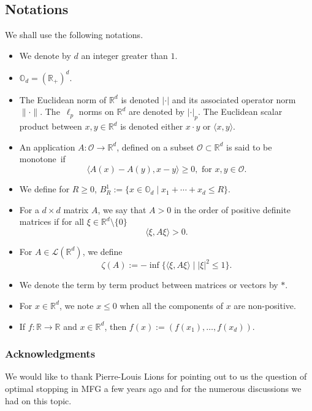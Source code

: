 \documentclass[10pt]{amsart}
\let\mathcal\mathscr
\let\sep\mid
\theoremstyle{definition}
\begin{document}
\subsection*{Notations}
We shall use the following notations.
\begin{itemize}
\item We denote by $d$ an integer greater than $1$.
\item $\mathbb{O}_d = (\mathbb{R}_+)^d$.
\item The Euclidean norm of $\mathbb{R}^d$ is denoted $|{\cdot}|$ and its associated operator norm $\|{\cdot}\|$. The~$\ell_p$ norms on $\mathbb{R}^d$ are denoted by $|{\cdot}|_p$. The Euclidean scalar product between \hbox{$x,y \in \mathbb{R}^d$} is denoted either $x \cdot y$ or $\langle x, y \rangle$.
\item An application $A: \mathcal{O} \to \mathbb{R}^d$, defined on a subset $\mathcal{O} \subset \mathbb{R}^d$ is said to be monotone~if
\begin{equation*}
\langle A(x)- A(y) , x-y \rangle \geq 0, \text{ for } x,y \in \mathcal{O}.
\end{equation*}
\item We define for $R\geq 0$, $B^1_R:= \{ x \in \mathbb{O}_d\sep x_1+\cdots+x_d \leq R\}$.
\item For a $d\times d$ matrix $A$, we say that $A > 0$ in the order of positive definite matrices if for all $\xi \in \mathbb{R}^d\setminus \{0\}$
\[
\langle \xi, A \xi \rangle > 0.
\]
\item For $A \in \mathcal{L}(\mathbb{R}^d)$, we define
\begin{equation*}
\zeta(A):= -\inf \{ \langle \xi, A\xi\rangle \sep |\xi|^2 \leq 1\}.
\end{equation*}
\item We denote the term by term product between matrices or vectors by $*$.
\item For $x \in \mathbb{R}^d$, we note $x\leq 0$ when all the components of $x$ are non-positive.
\item If $f: \mathbb{R} \to \mathbb{R}$ and $x\in \mathbb{R}^d$, then $f(x):= (f(x_1),\dots,f(x_d))$.
\end{itemize}

\subsubsection*{Acknowledgments}
We would like to thank Pierre-Louis Lions for pointing out to us the question of optimal stopping in MFG a few years ago and for the numerous discussions we had on this topic.
\end{document}
